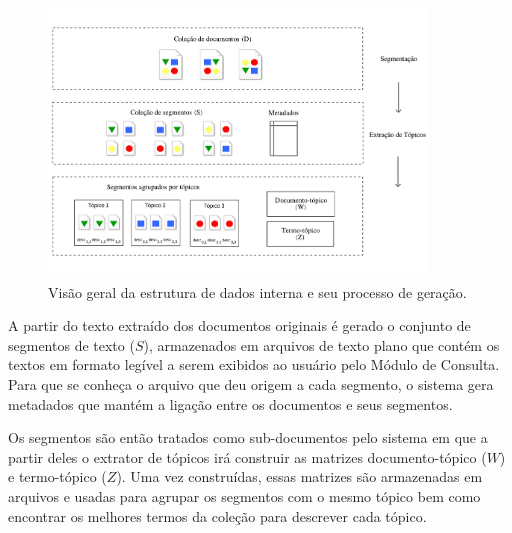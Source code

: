 


	\begin{figure}[h!]
\center
		\includegraphics[trim={ 0 40 0 40 },clip,page=1,width=0.9\textwidth]{conteudo/capitulos/figs/estrutura-de-dados-interna.pdf}

		\caption{Visão geral da estrutura de dados interna e seu processo de geração.}
		\label{fig:estrutura-dados-interna}
	\end{figure}




A partir do texto extraído dos documentos originais é gerado o conjunto de segmentos de texto ($S$), armazenados em arquivos de texto plano que contém os textos em formato legível a serem exibidos ao usuário pelo Módulo de Consulta. Para que se conheça o arquivo que deu origem a cada segmento, o sistema gera metadados que mantém a ligação entre os documentos e seus segmentos. 

Os segmentos são então tratados como sub-documentos pelo sistema em que a partir deles o extrator de tópicos irá construir as matrizes documento-tópico ($W$) e termo-tópico ($Z$). Uma vez construídas, essas matrizes são armazenadas em arquivos e usadas para agrupar os segmentos com o mesmo tópico bem como encontrar os melhores termos da coleção para descrever cada tópico.





